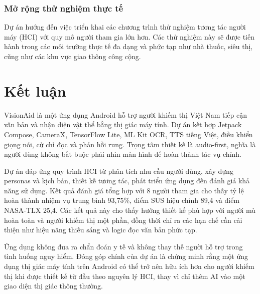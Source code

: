 \documentclass[a4paper,13pt]{report}
\begin{document}
\subsection{Mở rộng thử nghiệm thực tế}
Dự án hướng đến việc triển khai các chương trình thử nghiệm tương tác người máy (HCI) với quy mô người tham gia lớn hơn. Các thử nghiệm này sẽ được tiến hành trong các môi trường thực tế đa dạng và phức tạp như nhà thuốc, siêu thị, cũng như các khu vực giao thông công cộng.

\chapter{Kết luận}

VisionAid là một ứng dụng Android hỗ trợ người khiếm thị Việt Nam tiếp cận văn bản và nhận diện vật thể bằng thị giác máy tính. Dự án kết hợp Jetpack Compose, CameraX, TensorFlow Lite, ML Kit OCR, TTS tiếng Việt, điều khiển giọng nói, cử chỉ đọc và phản hồi rung. Trọng tâm thiết kế là audio-first, nghĩa là người dùng không bắt buộc phải nhìn màn hình để hoàn thành tác vụ chính.

Dự án đáp ứng quy trình HCI từ phân tích nhu cầu người dùng, xây dựng personas và kịch bản, thiết kế tương tác, phát triển ứng dụng đến đánh giá khả năng sử dụng. Kết quả đánh giá tổng hợp với 8 người tham gia cho thấy tỷ lệ hoàn thành nhiệm vụ trung bình 93,75\%, điểm SUS hiệu chỉnh 89,4 và điểm NASA-TLX 25,4. Các kết quả này cho thấy hướng thiết kế phù hợp với người mù hoàn toàn và người khiếm thị một phần, đồng thời chỉ ra các hạn chế cần cải thiện như hiệu năng thiếu sáng và logic đọc văn bản phức tạp.

Ứng dụng không đưa ra chẩn đoán y tế và không thay thế người hỗ trợ trong tình huống nguy hiểm. Đóng góp chính của dự án là chứng minh rằng một ứng dụng thị giác máy tính trên Android có thể trở nên hữu ích hơn cho người khiếm thị khi được thiết kế từ đầu theo nguyên lý HCI, thay vì chỉ thêm AI vào một giao diện thị giác thông thường.
\end{document}
